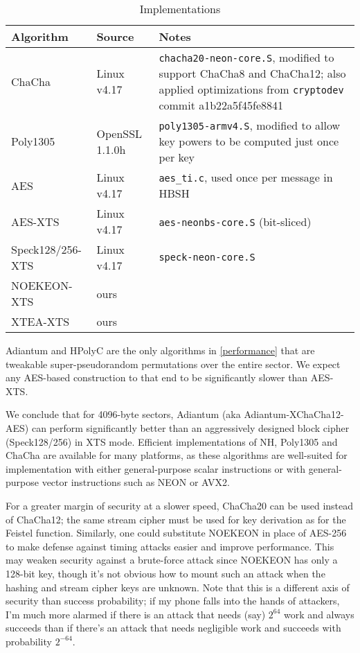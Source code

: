 \documentclass[journal=tosc,preprint,floatrow,submission]{iacrtrans}
\begin{document}
\begin{table}
    \caption{Implementations}
    \label{implementation}
    \centering
    \begin{tabular}{llp{7cm}}
        Algorithm & Source & Notes \\
    \hline
    ChaCha & Linux v4.17 & \texttt{chacha20-neon-core.S}, modified to support
        ChaCha8 and ChaCha12; also applied optimizations from \texttt{cryptodev}
        commit a1b22a5f45fe8841 \\
    Poly1305 & OpenSSL 1.1.0h & \texttt{poly1305-armv4.S}, modified to allow key
    powers to be computed just once per key \\
    \mbox{AES} & Linux v4.17 & \texttt{aes\_ti.c}, used once per message in HBSH \\
    \mbox{AES-XTS} & Linux v4.17 & \texttt{aes-neonbs-core.S} (bit-sliced) \\
    \mbox{Speck128/256-XTS} & Linux v4.17 & \texttt{speck-neon-core.S} \\
    \mbox{NOEKEON-XTS} & ours & \\
    \mbox{XTEA-XTS} & ours & \\
    \end{tabular}
\end{table}

Adiantum and HPolyC are the only algorithms in \autoref{performance} that are tweakable
super-pseudorandom permutations over the entire sector.  We expect any AES-based
construction to that end to be significantly slower than \mbox{AES-XTS}.

We conclude that for 4096-byte sectors, Adiantum
(aka \mbox{Adiantum-XChaCha12-AES}) can perform
significantly better than an aggressively designed block cipher (\mbox{Speck128/256}) in XTS mode.
Efficient implementations of NH, Poly1305 and ChaCha are available for many
platforms, as these algorithms are well-suited for implementation with either
general-purpose scalar instructions or with general-purpose vector instructions
such as NEON or AVX2.

For a greater margin of security at a slower speed, ChaCha20 can
be used instead of ChaCha12; the same stream cipher
must be used for key derivation as for the Feistel function. Similarly, one could substitute
NOEKEON in place of AES-256 to make defense against timing attacks easier and improve performance.
This may weaken security against a brute-force attack since NOEKEON has only a 128-bit key, though
it's not obvious how to mount such an attack when the hashing and stream cipher keys are unknown.
Note that this is a different axis of security than success probability; if my phone falls into
the hands of attackers, I'm much more alarmed if there is an attack that needs
(say) $2^{64}$ work and always succeeds than if there's an attack
that needs negligible work and succeeds with probability $2^{-64}$.
\end{document}
